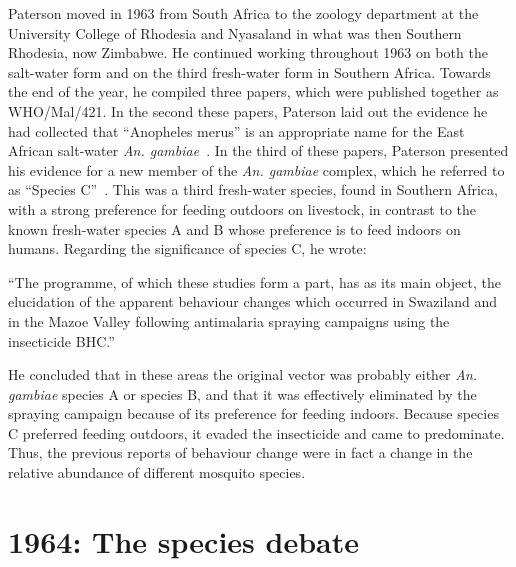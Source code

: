 \begin{refsection}
Paterson moved in 1963 from South Africa to the zoology department at the University College of Rhodesia and Nyasaland in what was then Southern Rhodesia, now Zimbabwe.
%
He continued working throughout 1963 on both the salt-water form and on the third fresh-water form in Southern Africa.
%
Towards the end of the year, he compiled three papers, which were published together as WHO/Mal/421.
%
In the second these papers, Paterson laid out the evidence he had collected that ``Anopheles merus'' is an appropriate name for the East African salt-water \textit{An. gambiae}~\parencite{Paterson1963a}.
%
In the third of these papers, Paterson presented his evidence for a new member of the \textit{An. gambiae} complex, which he referred to as ``Species C''~\parencite{Paterson1963b}.
%
This was a third fresh-water species, found in Southern Africa, with a strong preference for feeding outdoors on livestock, in contrast to the known fresh-water species A and B whose preference is to feed indoors on humans.
%
Regarding the significance of species C, he wrote:


\begin{displayquote}
``The programme, of which these studies form a part, has as its main object, the elucidation of the apparent behaviour changes which occurred in Swaziland and in the Mazoe Valley following antimalaria spraying campaigns using the insecticide BHC.''~\parencite{Paterson1963b}
\end{displayquote}


He concluded that in these areas the original vector was probably either \textit{An. gambiae} species A or species B, and that it was effectively eliminated by the spraying campaign because of its preference for feeding indoors.
%
Because species C preferred feeding outdoors, it evaded the insecticide and came to predominate.
%
Thus, the previous reports of behaviour change were in fact a change in the relative abundance of different mosquito species.


\section{1964: The species debate}\label{sec:1964}



\end{refsection}
